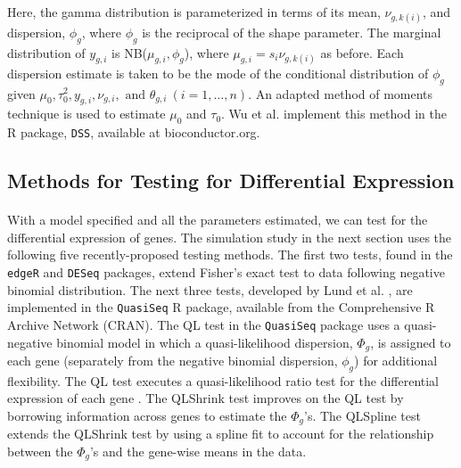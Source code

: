 \documentclass[10pt]{article}
\begin{document}
\paragraph{} \indent Here, the gamma distribution is parameterized in terms of its mean, $\nu_{g, k(i)}$, and dispersion, $\phi_g$, where $\phi_g$ is the reciprocal of the shape parameter. The marginal distribution of $y_{g, i}$ is NB($\mu_{g, i}, \phi_g$), where $\mu_{g, i} = s_i \nu_{g, k(i)}$ as before. Each dispersion estimate is taken to be the mode of the conditional distribution of $\phi_g$ given $\mu_0, \tau_0^2, y_{g, i}, \nu_{g, i}, \text{ and } \theta_{g, i} \ (i = 1, \ldots, n)$. An adapted method of moments technique is used to estimate $\mu_0$ and $\tau_0$. Wu et al. \cite{dss} implement this method in the R package, {\tt DSS}, available at bioconductor.org.







\subsection*{Methods for Testing for Differential Expression} \label{sec:test}

\paragraph{} \indent With a model specified and all the parameters estimated, we can test for the differential expression of genes. The simulation study in the next section uses the following five recently-proposed testing methods. The first two tests, found in the {\tt edgeR} and {\tt DESeq} packages, extend Fisher's exact test to data following negative binomial distribution. The next three tests, developed by Lund et al. \cite{quasiseq}, are implemented in the {\tt QuasiSeq} R package, available from the Comprehensive R Archive Network (CRAN). The QL test in the {\tt QuasiSeq} package uses a quasi-negative binomial model in which a quasi-likelihood dispersion, $\Phi_g$, is assigned to each gene (separately from the negative binomial dispersion, $\phi_g$) for additional flexibility. The QL test executes a quasi-likelihood ratio test for the differential expression of each gene %
. The QLShrink test improves on the QL test by borrowing information across genes to estimate the $\Phi_g$'s. The QLSpline test extends the QLShrink test by using a spline fit to account for the relationship between the $\Phi_g$'s and the gene-wise means in the data.
\end{document}
